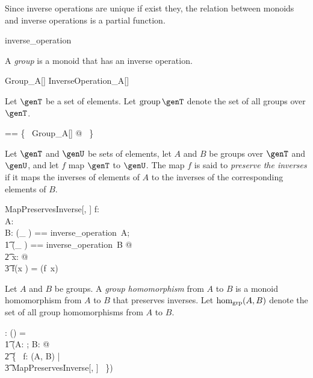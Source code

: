 \documentclass{amsart}
\begin{document}
\begin{remark}
Since inverse operations are unique if exist they, the relation between monoids and inverse operations
is a partial function.

\begin{zed}
	inverse\_operation \in \monoid \setT \pfun \setT \pfun \setT
\end{zed}

\end{remark}

A {\em group} is a monoid that has an inverse operation.
\begin{schema}{Group\_A}[\genT]
	InverseOperation\_A[\genT]
\end{schema}

Let $\genT$ be a set of elements.
Let $\group \genT$ denote the set of all groups over $\genT$.
\begin{zed}
	\group \genT == \{~ Group\_A[\genT] @ \strucA ~\}
\end{zed}

Let $\genT$ and $\genU$ be sets of elements,
let $A$ and $B$ be groups over $\genT$ and $\genU$, 
and let $f$ map $\genT$ to $\genU$.
The map $f$ is said to {\em preserve the inverses} if it maps the inverses of elements of $A$
to the inverses of the corresponding elements of $B$.
\begin{schema}{MapPreservesInverse}[\genT, \genU]
	f: \genT \pfun \genU \\
	A: \group \genT \\	
	B: \group \genU
\where
	\LET (\_ \invG) == inverse\_operation~A; \\
	\t1	(\_ \daggerG) == inverse\_operation~B @ \\
	\t2		\forall x: \genT @ \\
	\t3			f(x \invG) = (f~x) \daggerG
\end{schema}

Let $A$ and $B$ be groups.
A {\em group homomorphism} from $A$ to $B$ is a monoid homomorphism
from $A$ to $B$ that preserves inverses.
Let $\operatorname{hom_{grp}}(A, B)$ denote the set of all group homomorphisms from $A$ to $B$.
\begin{gendef}[\genT, \genU]
	\homGroup: \group \genT \cross \group \genU \fun \power (\genT \fun \genU)
\where
	\homGroup = \\
	\t1	(\lambda A: \group \genT; B: \group \genU @ \\
	\t2		\{~ f: \homMonoid(A, B) | \\
	\t3			MapPreservesInverse[\genT, \genU] ~\})
\end{gendef}
\end{document}
